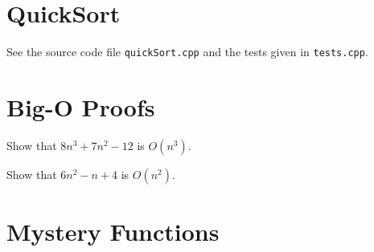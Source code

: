 \documentclass{article}
\begin{document}
    \section{QuickSort}

    See the source code file \texttt{quickSort.cpp} and the tests given in
    \texttt{tests.cpp}.

    \section{Big-O Proofs}

    \vspace{2mm}
     Show that $8n^3 + 7n^2 - 12$ is $O(n^3)$.


    \vspace{1cm}
     Show that $6n^2 - n + 4$ is $O(n^2)$.



    \vspace{1cm}
    \section{Mystery Functions}




    
\end{document}
